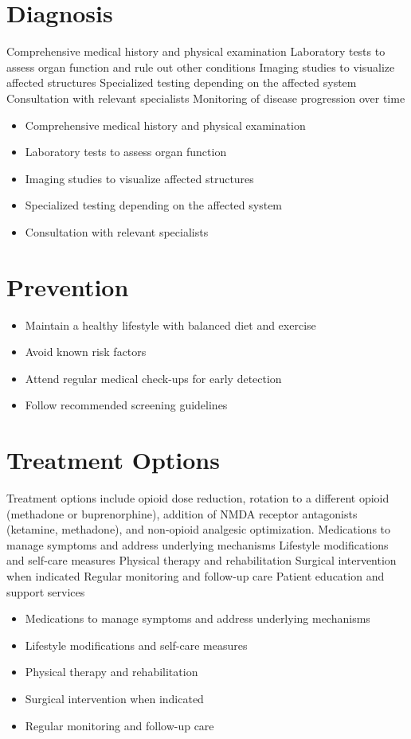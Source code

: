 \section{Diagnosis}
Comprehensive medical history and physical examination Laboratory tests to assess organ function and rule out other conditions Imaging studies to visualize affected structures Specialized testing depending on the affected system Consultation with relevant specialists Monitoring of disease progression over time

\begin{itemize}[noitemsep]
  \item Comprehensive medical history and physical examination
  \item Laboratory tests to assess organ function
  \item Imaging studies to visualize affected structures
  \item Specialized testing depending on the affected system
  \item Consultation with relevant specialists
\end{itemize}
\section{Prevention}
\begin{itemize}[noitemsep]
  \item Maintain a healthy lifestyle with balanced diet and exercise
  \item Avoid known risk factors
  \item Attend regular medical check-ups for early detection
  \item Follow recommended screening guidelines
\end{itemize}
\section{Treatment Options}
Treatment options include opioid dose reduction, rotation to a different opioid (methadone or buprenorphine), addition of NMDA receptor antagonists (ketamine, methadone), and non-opioid analgesic optimization. Medications to manage symptoms and address underlying mechanisms Lifestyle modifications and self-care measures Physical therapy and rehabilitation Surgical intervention when indicated Regular monitoring and follow-up care Patient education and support services

\begin{itemize}[noitemsep]
  \item Medications to manage symptoms and address underlying mechanisms
  \item Lifestyle modifications and self-care measures
  \item Physical therapy and rehabilitation
  \item Surgical intervention when indicated
  \item Regular monitoring and follow-up care
\end{itemize}
